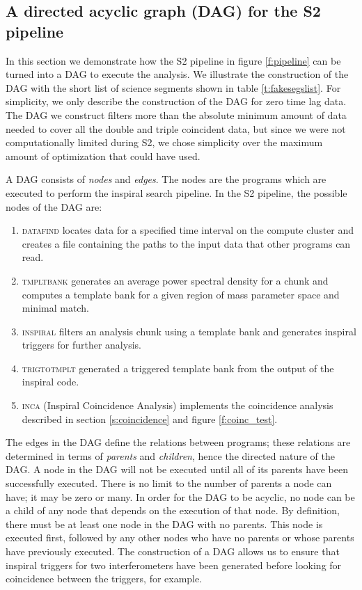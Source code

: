 \subsection{A directed acyclic graph (DAG) for the S2 pipeline}
\label{ss:dag}

In this section we demonstrate how the S2 pipeline in figure \ref{f:pipeline}
can be turned into a DAG to execute the analysis. We illustrate the
construction of the DAG with the short list of science segments shown in table
\ref{t:fakesegslist}. For simplicity, we only describe the construction of the
DAG for zero time lag data. The DAG we construct filters more than the
absolute minimum amount of data needed to cover all the double and triple
coincident data, but since we were not computationally limited during S2, we
chose simplicity over the maximum amount of optimization that could have used.

A DAG consists of \emph{nodes} and \emph{edges}. The nodes are the programs
which are executed to perform the inspiral search pipeline. In the S2
pipeline, the possible nodes of the DAG are:
\begin{enumerate}
\item\textsc{datafind} locates data for a specified time interval on the
compute cluster and creates a file containing the paths to the input data that
other programs can read.

\item\textsc{tmpltbank} generates an average power spectral density for a
chunk and computes a template bank for a given region of mass parameter space
and minimal match.

\item\textsc{inspiral} filters an analysis chunk using a template bank and
generates inspiral triggers for further analysis.

\item\textsc{trigtotmplt} generated a triggered template bank from the
output of the inspiral code.

\item\textsc{inca} (Inspiral Coincidence Analysis) implements the
coincidence analysis described in section \ref{s:coincidence} and figure
\ref{f:coinc_test}.
\end{enumerate}
The edges in the DAG define the relations between programs; these relations
are determined in terms of \emph{parents} and \emph{children}, hence the
directed nature of the DAG. A node in the DAG will not be executed until all
of its parents have been successfully executed. There is no limit to the
number of parents a node can have; it may be zero or many. In order for the
DAG to be acyclic, no node can be a child of any node that depends on the
execution of that node. By definition, there must be at least one node in the
DAG with no parents. This node is executed first, followed by any other nodes
who have no parents or whose parents have previously executed.  The
construction of a DAG allows us to ensure that inspiral triggers for two
interferometers have been generated before looking for coincidence between the
triggers, for example.

